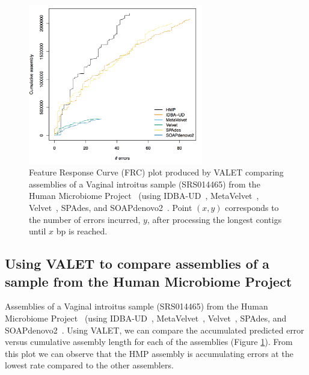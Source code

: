 \documentclass{bioinfo}
\begin{document}
\begin{figure}
\begin{center}
\includegraphics[width=3in]{figures/frc.png}
\end{center}
\caption[hmp_frc]{Feature Response Curve (FRC) plot produced by VALET comparing assemblies of a Vaginal introitus sample (SRS014465) from the Human Microbiome Project~\citep{human2012structure} (using IDBA-UD~\citep{peng2012idba}, MetaVelvet~\citep{namiki2012metavelvet}, Velvet~\citep{zerbino2008velvet}, SPAdes\citep{bankevich2012spades}, and SOAPdenovo2~\citep{luo2012soapdenovo2}. Point $(x,y)$ corresponds to the number of errors incurred, $y$, after processing the longest contigs until $x$ bp is reached.}
\label{fig:hmp_frc}
\end{figure}

\subsection{Using VALET to compare assemblies of a sample from the Human Microbiome Project}

Assemblies of a Vaginal introitus sample (SRS014465) from the Human Microbiome Project~\citep{human2012structure} (using IDBA-UD~\citep{peng2012idba}, MetaVelvet~\citep{namiki2012metavelvet}, Velvet~\citep{zerbino2008velvet}, SPAdes\citep{bankevich2012spades}, and SOAPdenovo2~\citep{luo2012soapdenovo2}.
Using VALET, we can compare the accumulated predicted error versus cumulative assembly length for each of the assemblies (Figure \ref{fig:hmp_frc}).
From this plot we can observe that the HMP assembly is accumulating errors at the lowest rate compared to the other assemblers.
\end{document}
